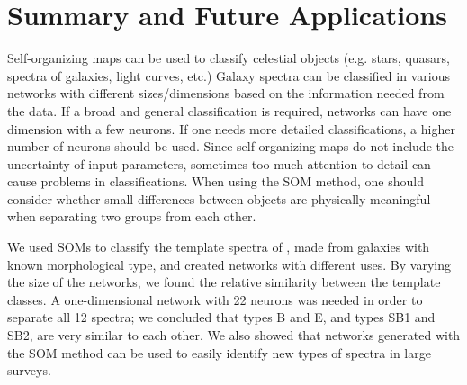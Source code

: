 \section{Summary and Future Applications}
\label{sec: summary_SOMZ}

Self-organizing maps can be used to classify celestial objects (e.g. stars, quasars, spectra of galaxies, light curves, etc.)
Galaxy spectra can be classified in various networks with different sizes/dimensions based on the information needed from the data. 
If a broad and general classification is required, networks can have one dimension with a few neurons.
If one needs more detailed classifications, a higher number of neurons should be used.
Since self-organizing maps do not include the uncertainty of input parameters, sometimes too much attention to detail can cause problems in classifications. 
When using the SOM method, one should consider whether small differences between objects are physically meaningful when separating two groups from each other.

We used SOMs to classify the template spectra of , made from galaxies with known morphological type, and created networks with different uses.
By varying the size of the networks, we found the relative similarity between the  template classes.
A one-dimensional network with 22 neurons was needed in order to
separate all 12  spectra; we concluded that  types B and E, and types SB1 and SB2, are very similar to each other.
We also showed that networks generated with the SOM method can be used to easily identify new types of spectra in large surveys.

